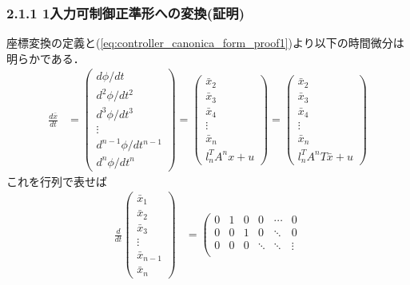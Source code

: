 \begin{frame}[t]
\frametitle{2.1.1 1入力可制御正準形への変換(証明)}
座標変換の定義と(\ref{eq:controller_canonica_form_proof1})より以下の時間微分は明らかである．
\begin{align}
	\frac{d \bar{x}}{dt}
	& =
	\left(\begin{array}{c}
	     d \phi /dt \\
	     d^2 \phi /dt^2 \\
	     d^3 \phi /dt^3 \\
		 \vdots \\
	     d^{n-1} \phi /dt^{n-1} \\
	     d^{n} \phi /dt^{n}
	\end{array}\right)
	=
	\left(\begin{array}{c}
	     \bar{x}_2 \\
	     \bar{x}_3 \\
	     \bar{x}_4 \\
		 \vdots \\
	     \bar{x}_{n} \\
	     l_n^T A^{n} x + u
	\end{array}\right)
	=
	\left(\begin{array}{c}
	     \bar{x}_2 \\
	     \bar{x}_3 \\
	     \bar{x}_4 \\
		 \vdots \\
	     \bar{x}_{n} \\
	     l_n^T A^{n} T \bar{x} + u
	\end{array}\right)
\end{align}
これを行列で表せば
\begin{align}
 \frac{d}{dt}
  \left(\begin{array}{c}
     \bar{x}_1 \\
	 \bar{x}_2 \\
	 \bar{x}_3 \\
	 \vdots \\
	 \bar{x}_{n-1} \\
	 \bar{x}_n
	\end{array}\right)
  &=
  \left(\begin{array}{cccccc}
     0      & 1      & 0      & 0      & \cdots & 0     \\
     0      & 0      & 1      & 0      & \ddots & 0     \\
	 0      & 0      & 0      & \ddots & \ddots & \vdots\\

\end{array}
\end{align}
\end{frame}
